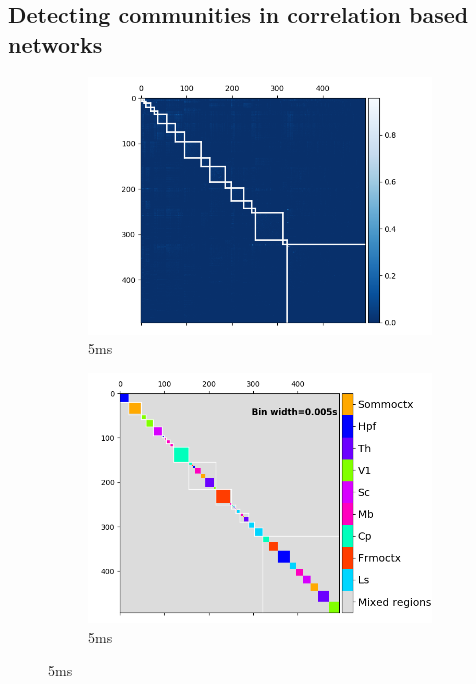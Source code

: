 \documentclass[a4paper,12pt]{article}
\theoremstyle{definition}
\begin{document}
  \subsection{Detecting communities in correlation based networks}
  \begin{figure}
    \begin{subfigure}[h]{0.5\linewidth}
      \includegraphics[width=\linewidth]{figures/Krebs_0p005_rectified_cons_cluster_map.png}
      \caption{5ms}
      \label{fig:consensus_cluster_5ms}
    \end{subfigure}
    \begin{subfigure}[h]{0.5\linewidth}
      \includegraphics[width=\linewidth]{figures/Krebs_0p005_regional_cluster_map.png}
      \caption{5ms}

\end{subfigure}
\end{figure}
\end{document}
